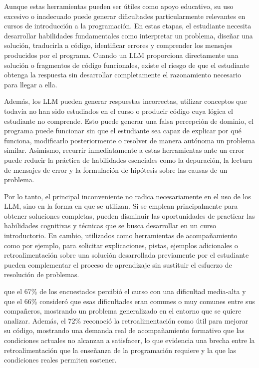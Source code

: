 \documentclass[letterpaper, 10 pt, conference]{ieeeconf}
\begin{document}
Aunque estas herramientas pueden ser útiles como apoyo educativo, su uso excesivo o inadecuado puede generar dificultades particularmente relevantes en cursos de introducción a la programación. En estas etapas, el estudiante necesita desarrollar habilidades fundamentales como interpretar un problema, diseñar una solución, traducirla a código, identificar errores y comprender los mensajes producidos por el programa. Cuando un LLM proporciona directamente una solución o fragmentos de código funcionales, existe el riesgo de que el estudiante obtenga la respuesta sin desarrollar completamente el razonamiento necesario para llegar a ella.

Además, los LLM pueden generar respuestas incorrectas, utilizar conceptos que todavía no han sido estudiados en el curso o producir código cuya lógica el estudiante no comprende. Esto puede generar una falsa percepción de dominio, el programa puede funcionar sin que el estudiante sea capaz de explicar por qué funciona, modificarlo posteriormente o resolver de manera autónoma un problema similar. Asimismo, recurrir inmediatamente a estas herramientas ante un error puede reducir la práctica de habilidades esenciales como la depuración, la lectura de mensajes de error y la formulación de hipótesis sobre las causas de un problema.

Por lo tanto, el principal inconveniente no radica necesariamente en el uso de los LLM, sino en la forma en que se utilizan. Si se emplean principalmente para obtener soluciones completas, pueden disminuir las oportunidades de practicar las habilidades cognitivas y técnicas que se busca desarrollar en un curso introductorio. En cambio, utilizados como herramientas de acompañamiento como por ejemplo, para solicitar explicaciones, pistas, ejemplos adicionales o retroalimentación sobre una solución desarrollada previamente por el estudiante pueden complementar el proceso de aprendizaje sin sustituir el esfuerzo de resolución de problemas.

que el 67\% de los encuestados percibió el curso con una dificultad media-alta y que el 66\% consideró que esas dificultades eran comunes o muy comunes entre sus compañeros, mostrando un problema generalizado en el entorno que se quiere analizar. Además, el 72\% reconoció la retroalimentación como útil para mejorar su código, mostrando una demanda real de acompañamiento formativo que las condiciones actuales no alcanzan a satisfacer, lo que evidencia una brecha entre la retroalimentación que la enseñanza de la programación requiere y la que las condiciones reales permiten sostener.
\end{document}
